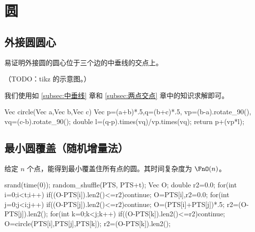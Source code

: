 \section{圆}
\subsection{外接圆圆心}
易证明外接圆的圆心位于三个边的中垂线的交点上。

（TODO：tikz 的示意图。）

我们使用如 \ref{subsec:中垂线} 章和 \ref{subsec:两点交点} 章中的知识求解即可。

\begin{Cpp}
Vec circle(Vec a,Vec b,Vec c){
  Vec p=(a+b)*.5,q=(b+c)*.5,
      vp=(b-a).rotate_90(),
      vq=(c-b).rotate_90();
  double l=(q-p).times(vq)/vp.times(vq);
  return p+(vp*l);
}
\end{Cpp}

\subsection{最小圆覆盖（随机增量法）}
给定 $n$ 个点，能得到最小覆盖住所有点的圆。其时间复杂度为 $\FnO(n)$。

\begin{Cpp}
srand(time(0));
random_shuffle(PTS, PTS+t);
Vec O; double r2=0.0;
for(int i=0;i<t;i++){
  if((O-PTS[i]).len2()<=r2)continue;
  O=PTS[i],r2=0.0;
  for(int j=0;j<i;j++){
    if((O-PTS[j]).len2()<=r2)continue;
    O=(PTS[i]+PTS[j])*.5;
    r2=(O-PTS[j]).len2();
    for(int k=0;k<j;k++){
      if((O-PTS[k]).len2()<=r2)continue;
      O=circle(PTS[i],PTS[j],PTS[k]);
      r2=(O-PTS[k]).len2();
    }
  }
}
\end{Cpp}


